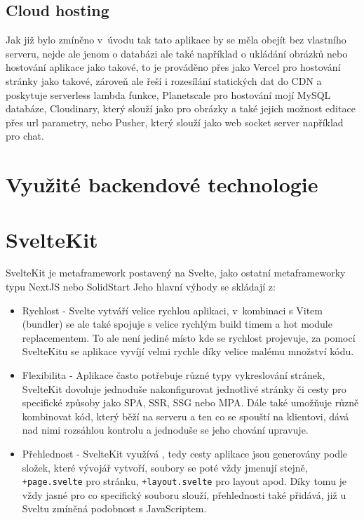 \documentclass[12pt, a4paper,
openright
]{report}
\begin{document}
\subsection{Cloud hosting}
Jak již bylo zmíněno v~úvodu tak tato aplikace by se měla obejít bez vlastního serveru, nejde ale jenom o databázi ale také například o ukládání obrázků nebo hostování aplikace jako takové, to je prováděno přes  jako Vercel pro hostování stránky jako takové, zároveň ale řeší i rozesílání statických dat do CDN a poskytuje serverless lambda funkce, Planetscale pro hostování mojí MySQL databáze, Cloudinary, který slouží jako  pro obrázky a také jejich možnost editace přes url parametry, nebo Pusher, který slouží jako web socket server například pro chat.

\section{Využité backendové technologie}

\section{SvelteKit}

SvelteKit je metaframework postavený na Svelte, jako ostatní metaframeworky typu NextJS nebo SolidStart Jeho hlavní výhody se skládají z:
\begin{itemize}
	\item Rychlost - Svelte vytváří velice rychlou aplikaci, v~kombinaci s Vitem (bundler) se ale také spojuje s velice rychlým build timem a hot module replacementem. To ale není jediné místo kde se rychlost projevuje, za pomocí SvelteKitu se aplikace vyvíjí velmi rychle díky velice malému množství  kódu.
	\item Flexibilita - Aplikace často potřebuje různé typy vykreslování stránek, SvelteKit dovoluje jednoduše nakonfigurovat jednotlivé stránky či cesty pro specifické způsoby jako SPA, SSR, SSG nebo MPA. Dále také umožňuje různě kombinovat kód, který běží na serveru a ten co se spouští na klientovi, dává nad nimi rozsáhlou kontrolu a jednoduše se jeho chování upravuje.
	\item Přehlednost - SvelteKit využívá , tedy cesty aplikace jsou generovány podle složek, které vývojář vytvoří, soubory se poté vždy jmenují stejně, \texttt{+page.svelte} pro stránku, \texttt{+layout.svelte} pro layout apod. Díky tomu je vždy jasné pro co specifický souboru slouží, přehlednosti také přidává, již u Sveltu zmíněná podobnost s JavaScriptem.
\end{itemize} 
\end{document}
